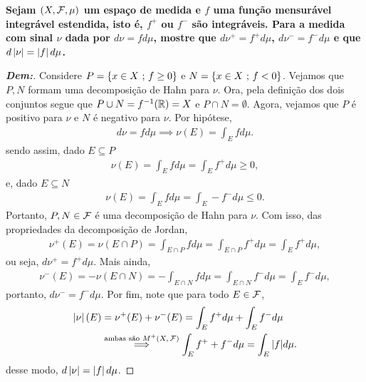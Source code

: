 \textbf{Sejam $(X, \mathcal F, \mu)$ um espaço de medida e $f$ 
uma função mensurável integrável estendida, isto é, $f^+$ ou $f^-$ são integráveis. 
Para a medida com sinal $\nu$ dada por $d\nu = fd\mu$, mostre que $d\nu^+ = f^+d\mu$, 
$d\nu^- = f^-d\mu$ e que $d\left|\nu\right| = \left|f\right| d\mu$.}
\begin{proof}[\textbf{Dem:}] Considere $P = \left\{x \in X \text{ ; } f\ge 0\right\}$ 
  e $N = \left\{x \in X \text{ ; } f < 0\right\}$. Vejamos que $P, N$ formam uma decomposição 
  de Hahn para $\nu$. Ora, pela definição dos dois conjuntos segue que 
  $P \cup N = f^{-1}(\mathbb R) = X$ e $P \cap N = \emptyset$. Agora, vejamos 
  que $P$ é positivo para $\nu$ e $N$ é negativo para $\nu$. Por hipótese, 
  \begin{align*}
    d\nu = f d\mu \implies \nu(E) = \int_E f d\mu.
  \end{align*}
  sendo assim, dado $E \subseteq P$ 
  \begin{align*}
    \nu(E) = \int_E f d\mu = \int_E f^+ d\mu \ge 0,
  \end{align*}
  e, dado $E \subseteq N$ 
  \begin{align*}
    \nu(E) = \int_E f d\mu = \int_E -f^- d\mu \le 0.
  \end{align*}
  Portanto, $P, N \in \mathcal F$ é uma decomposição de Hahn para $\nu$. 
  Com isso, das propriedades da decomposição de Jordan, 
  \begin{align*}
    \nu^+(E) = \nu(E\cap P) = \int_{E\cap P} f d\mu = \int_{E\cap P} f^+ d\mu 
    = \int_{E} f^+ d\mu, 
  \end{align*}
  ou seja, $d\nu^+ = f^+ d\mu$. Mais ainda, 
  \begin{align*}
    \nu^-(E) = -\nu(E\cap N) = -\int_{E \cap N} f d\mu = \int_{E\cap N} f^- d\mu
    =\int_E f^- d\mu,
  \end{align*}
  portanto, $d\nu^- = f^- d\mu$. Por fim, note que para todo $E \in \mathcal F$, 
  \begin{align*}
    \left|\nu\right|(E) &= \nu^+(E) + \nu^-(E) = \int_E f^+ d\mu + \int_E f^- d\mu\\ 
    &\overset{\text{ambas são $M^+(X,\mathcal F)$}}{\implies} \int_E f^+ + f^- d\mu = \int_E |f| d\mu.
  \end{align*}
  desse modo, $d\left|\nu\right| = \left|f\right| d\mu$.
\end{proof}

